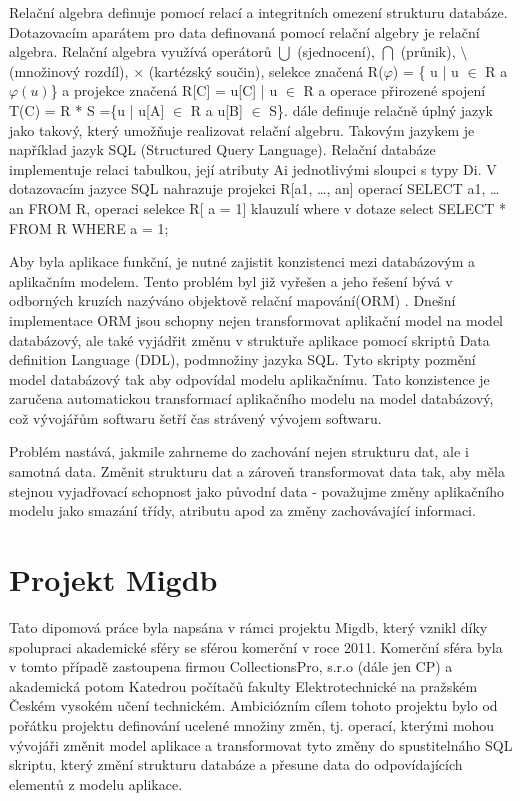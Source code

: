 \documentclass[11pt,twoside,a4paper]{book}
\begin{document}
Relační algebra definuje pomocí relací a integritních omezení strukturu
databáze. Dotazovacím aparátem pro data definovaná pomocí relační algebry je
relační algebra. Relační algebra využívá operátorů $\bigcup$ (sjednocení),
$\bigcap$ (průnik), $\setminus$ (množinový rozdíl), $\times$ (kartézský
součin), selekce značená R($\varphi $) = \{ u | u $\in$ R a  $\varphi(u)$\} a
projekce značená R[C] = { u[C] | u $\in$ R} a operace přirozené spojení T(C) =
R * S =\{u | u[A] $\in$ R a u[B] $\in$ S\}.
\cite{Relacni_algebra} dále definuje relačně úplný jazyk jako takový, který
umožňuje realizovat relační algebru. Takovým jazykem je například jazyk SQL 
(Structured Query Language). Relační databáze implementuje relaci tabulkou, její
atributy Ai jednotlivými sloupci s typy Di. V dotazovacím jazyce SQL nahrazuje
projekci R[a1, \ldots , an] operací SELECT a1, \ldots an FROM R, operaci
selekce R[ a = 1] klauzulí where v dotaze select  SELECT * FROM R WHERE a = 1; 

Aby byla aplikace funkční, je nutné zajistit
konzistenci mezi databázovým a aplikačním modelem.
Tento problém byl již vyřešen a jeho řešení bývá v odborných kruzích nazýváno
objektově relační mapování(ORM) \cite{orm}. Dnešní implementace ORM jsou schopny nejen
transformovat aplikační model na model databázový, ale také vyjádřit změnu v struktuře
aplikace pomocí skriptů Data definition Language (DDL), podmnožiny jazyka SQL.
Tyto skripty pozmění model databázový tak aby odpovídal modelu aplikačnímu.
Tato konzistence je zaručena automatickou transformací aplikačního modelu na
model databázový, což vývojářům softwaru šetří čas strávený vývojem softwaru.

Problém nastává, jakmile zahrneme do zachování nejen strukturu dat, ale i
samotná data. Změnit strukturu dat a zároveň transformovat data tak, aby měla
stejnou vyjadřovací schopnost jako původní data - považujme změny aplikačního
modelu jako smazání třídy, atributu apod za změny zachovávající informaci.


\chapter{Projekt Migdb}

Tato dipomová práce byla napsána v rámci projektu Migdb, který vznikl díky
spolupraci akademické sféry se sférou komerční v roce 2011. Komerční sféra byla
v tomto případě zastoupena firmou CollectionsPro, s.r.o (dále jen CP) a
akademická potom Katedrou počítačů fakulty Elektrotechnické na pražském
Českém vysokém učení technickém. Ambiciózním cílem tohoto projektu bylo od
pořátku projektu definování ucelené množiny změn, tj. operací, kterými mohou vývojáři změnit
model aplikace a transformovat tyto změny do spustitelnáho SQL skriptu, který
změní strukturu databáze a přesune data do odpovídajících elementů z modelu
aplikace.
\end{document}

